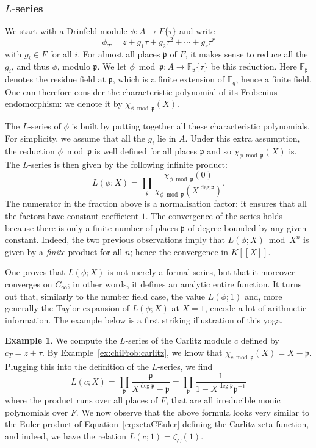 \documentclass[11pt]{article}
\theoremstyle{definition}
\newtheorem{example}[theorem]{Example}
\newcommand\F{\mathbb{F}}
\newcommand\Fq{\mathbb{F}_q}
\newcommand{\p}{\mathfrak{p}}
\newcommand{\Cinf}{C_{\infty}}
\begin{document}
\subsubsection{\texorpdfstring{$L$}{L}-series}
\label{sssec:arith:Lseries}

We start with a Drinfeld module $\phi : A \to F\{\tau\}$
and write
$$\phi_T = z + g_1 \tau + g_2 \tau^2 + \cdots + g_r \tau^r$$
with $g_i \in F$ for all $i$. For almost all places $\p$ of $F$, it
makes sense to reduce all the $g_i$, and thus $\phi$, modulo $\p$.
We let $\phi \bmod \p : A \to \F_\p\{\tau\}$ be this reduction. Here 
$\F_\p$ denotes the residue field at $\p$, which is a finite extension of $\Fq$, hence a finite field.
One can therefore consider the characteristic polynomial of its
Frobenius endomorphism: we denote it by $\chi_{\phi \bmod \p}(X)$.

The $L$-series of $\phi$ is built by putting together all these 
characteristic polynomials. For simplicity, we assume that all the 
$g_i$ lie in $A$. Under this extra 
assumption, the reduction $\phi \bmod \p$ is well defined for 
all places $\p$ and so $\chi_{\phi \bmod \p}(X)$ is.
The $L$-series is then given by the following infinite product:
$$L(\phi; X) = \prod_{\p} 
  \frac{\chi_{\phi \bmod \p}(0)}{\chi_{\phi \bmod \p}(X^{\deg \p})}.$$
The numerator in the fraction above is a normalisation factor: it
ensures that all the factors have constant coefficient $1$. The
convergence of the series holds because there is 
only a finite number of places $\p$ of degree bounded by any given
constant. Indeed, the two previous observations imply that 
$L(\phi; X) \bmod X^n$ is given by a \emph{finite} product for
all $n$; hence the convergence in $K[[X]]$.

One proves that $L(\phi; X)$ is not merely a formal series, but that it moreover converges on $\Cinf$; in other words, it defines an analytic entire function. It turns out that, similarly to
the number field case, the value $L(\phi; 1)$ and, more generally
the Taylor expansion of $L(\phi; X)$ at $X = 1$, encode a lot of
arithmetic information.
The example below is a first striking illustration of this yoga.

\begin{example}
\label{ex:Lseries:carlitz}
We compute the $L$-series of the Carlitz module $c$ defined by
$c_T = z + \tau$.
By Example~\ref{ex:chiFrob:carlitz}, we know that
$\chi_{c \bmod \p}(X) = X - \p$. Plugging this into the definition
of the $L$-series, we find
$$L(c; X) = \prod_{\p} \frac{\p}{X^{\deg \p} - \p}
  = \prod_{\p} \frac{1}{1 - X^{\deg \p} \p^{-1}}$$
where the product runs over all places of $F$, that are all
irreducible monic polynomials over $F$.
We now observe that the above formula looks very similar to the Euler product of Equation~\eqref{eq:zetaCEuler} defining the Carlitz zeta function, and indeed, we have the relation
$L(c; 1) = \zeta_C(1)$.
\end{example}
\end{document}
